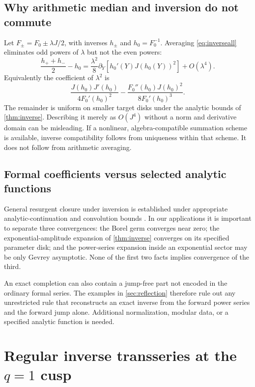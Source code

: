 \documentclass[11pt,a4paper]{article}
\numberwithin{equation}{section}
\theoremstyle{definition}
\theoremstyle{remark}
\begin{document}
\subsection{Why arithmetic median and inversion do not commute}
Let $F_\pm=F_0\pm\lambda J/2$, with inverses $h_\pm$ and $h_0=F_0^{-1}$.
Averaging \eqref{eq:inverseall} eliminates odd powers of $\lambda$ but
not the even powers:
\begin{equation}
 \frac{h_++h_-}{2}-h_0
 =\frac{\lambda^2}{8}\partial_Y
        \left[h_0'(Y)J(h_0(Y))^2\right]+O(\lambda^4).
 \label{eq:medianbias}
\end{equation}
Equivalently the coefficient of $\lambda^2$ is
\[
 \frac{J(h_0)J'(h_0)}{4F_0'(h_0)^2}
 -\frac{F_0''(h_0)J(h_0)^2}{8F_0'(h_0)^3}.
\]
The remainder is uniform on smaller target disks under the analytic
bounds of \cref{thm:inverse}. Describing it merely as $O(J^4)$ without
a norm and derivative domain can be misleading. If a nonlinear,
algebra-compatible summation scheme is available, inverse
compatibility follows from uniqueness within that scheme. It does
not follow from arithmetic averaging.

\subsection{Formal coefficients versus selected analytic functions}
General resurgent closure under inversion is established under
appropriate analytic-continuation and convolution bounds
\cite{sauzin,sauzinintro}. In our applications it is important to
separate three convergences: the Borel germ converges near zero; the
exponential-amplitude expansion of \cref{thm:inverse} converges on its
specified parameter disk; and the power-series expansion inside an
exponential sector may be only Gevrey asymptotic. None of the first
two facts implies convergence of the third.

An exact completion can also contain a jump-free part not encoded in
the ordinary formal series. The examples in \cref{sec:reflection}
therefore rule out any unrestricted rule that reconstructs an exact
inverse from the forward power series and the forward jump alone.
Additional normalization, modular data, or a specified analytic
function is needed.

\section{Regular inverse transseries at the \texorpdfstring{$q=1$}{q=1} cusp}
\label{sec:cusp}
\end{document}
